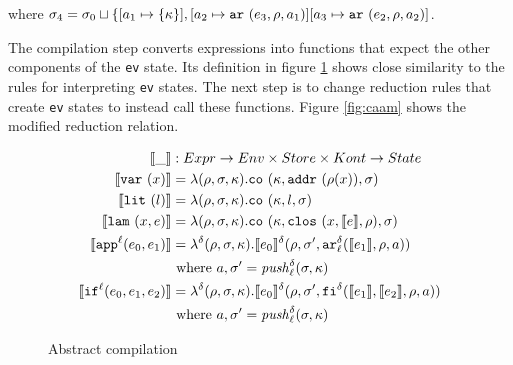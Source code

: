 \documentclass[preprint,onecolumn,9pt]{sigplanconf} %
\begin{document}
where $\msto_4 = \msto_0 \sqcup \{ [\maddr_1 \mapsto \{ \mkont \}],
[\maddr_2 \mapsto \kar{\mexp_3,\menv,\maddr_1}]
[\maddr_3 \mapsto \kar{\mexp_2,\menv,\maddr_2}]$.

The compilation step converts expressions into functions that expect
the other components of the {\tt ev} state. Its definition in figure
\ref{fig:compile} shows close similarity to the rules for interpreting
    {\tt ev} states. The next step is to change reduction rules that
    create {\tt ev} states to instead call these functions. Figure
    \ref{fig:caam} shows the modified reduction relation.

\begin{figure}
\begin{align*}
\compile{\_} &: Expr \to Env \times Store \times Kont \to State \\
\compile{\svar\mvar} &= \lambda(\menv,\msto,\mkont) .\co{\mkont,\saddr{\menv(\mvar)},\msto}
\\
\compile{\slit\mlit} &= \lambda(\menv,\msto,\mkont) .
\co{\mkont,\mlit,\msto}
\\
\compile{\slam\mvar\mexp} &= \lambda(\menv,\msto,\mkont) .
\co{\mkont,\clos{\mvar,\compile\mexp,\menv},\msto}
\\
\compile{\sapp[^\mlab]{\mexpi0}{\mexpi1}} &= \lambda^\mcntr(\menv,\msto,\mkont) .
\compile{\mexpi0}^\mcntr(\menv,\msto',\kar[_\mlab^\mcntr]{\compile{\mexpi1},\menv,\maddr})
\\
&
\text{ where }\maddr,\msto' = \mathit{push}^\mcntr_\mlab(\msto,\mkont)
\\
\compile{\sif[^\mlab]{\mexpi0}{\mexpi1}{\mexpi2}} &= \lambda^\mcntr(\menv,\msto,\mkont) .
\compile{\mexpi0}^\delta(\menv,\msto',\kif[^\mcntr]{\compile{\mexpi1},\compile{\mexpi2},\menv,\maddr})
\\
&\text{ where }\maddr,\msto' = \mathit{push}_\mlab^\mcntr(\msto,\mkont)
\end{align*}
\caption{Abstract compilation}
\label{fig:compile}
\end{figure}
\end{document}

